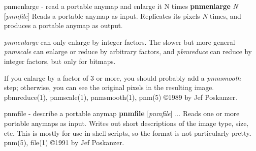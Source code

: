 pnmenlarge - read a portable anymap and enlarge it N times
{\bf pnmenlarge}
{\it N}
{\rm [}{\it pnmfile}{\rm ]}
Reads a portable anymap as input.
Replicates its pixels
{\it N}
times, and produces a portable anymap as output.
\par
{\it pnmenlarge}
can only enlarge by integer factors.
The slower but more general
{\it pnmscale}
can enlarge or reduce by arbitrary
factors, and
{\it pbmreduce}
can reduce by integer factors, but only for bitmaps.
\par
If you enlarge by a factor of 3 or more, you should probably add a
{\it pnmsmooth}
step; otherwise, you can see the original pixels in the resulting image.
pbmreduce(1), pnmscale(1), pnmsmooth(1), pnm(5)
\copyright 1989 by Jef Poskanzer.
%
 
%

\newpage
%

pnmfile - describe a portable anymap
{\bf pnmfile}
{\rm [}{\it pnmfile}{\rm ]}
{\rm ...}
Reads one or more portable anymaps as input.
Writes out short descriptions of the image type, size, etc.
This is mostly for use in shell scripts, so the format is not
particularly pretty.
pnm(5), file(1)
\copyright 1991 by Jef Poskanzer.
%
 

